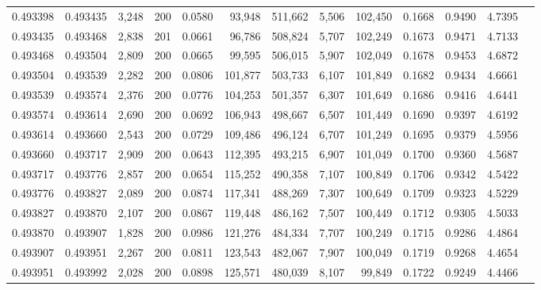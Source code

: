 \begin{tabular}{rrrrrrrrrrrrr}
0.493398 & 0.493435 & 3,248 & 200 &                                     0.0580 &  93,948 & 511,662 &   5,506 & 102,450 & 0.1668 & 0.9490 & 4.7395 \\
0.493435 & 0.493468 & 2,838 & 201 &                                     0.0661 &  96,786 & 508,824 &   5,707 & 102,249 & 0.1673 & 0.9471 & 4.7133 \\
0.493468 & 0.493504 & 2,809 & 200 &                                     0.0665 &  99,595 & 506,015 &   5,907 & 102,049 & 0.1678 & 0.9453 & 4.6872 \\
0.493504 & 0.493539 & 2,282 & 200 &                                     0.0806 & 101,877 & 503,733 &   6,107 & 101,849 & 0.1682 & 0.9434 & 4.6661 \\
0.493539 & 0.493574 & 2,376 & 200 &                                     0.0776 & 104,253 & 501,357 &   6,307 & 101,649 & 0.1686 & 0.9416 & 4.6441 \\
0.493574 & 0.493614 & 2,690 & 200 &                                     0.0692 & 106,943 & 498,667 &   6,507 & 101,449 & 0.1690 & 0.9397 & 4.6192 \\
0.493614 & 0.493660 & 2,543 & 200 &                                     0.0729 & 109,486 & 496,124 &   6,707 & 101,249 & 0.1695 & 0.9379 & 4.5956 \\
0.493660 & 0.493717 & 2,909 & 200 &                                     0.0643 & 112,395 & 493,215 &   6,907 & 101,049 & 0.1700 & 0.9360 & 4.5687 \\
0.493717 & 0.493776 & 2,857 & 200 &                                     0.0654 & 115,252 & 490,358 &   7,107 & 100,849 & 0.1706 & 0.9342 & 4.5422 \\
0.493776 & 0.493827 & 2,089 & 200 &                                     0.0874 & 117,341 & 488,269 &   7,307 & 100,649 & 0.1709 & 0.9323 & 4.5229 \\
0.493827 & 0.493870 & 2,107 & 200 &                                     0.0867 & 119,448 & 486,162 &   7,507 & 100,449 & 0.1712 & 0.9305 & 4.5033 \\
0.493870 & 0.493907 & 1,828 & 200 &                                     0.0986 & 121,276 & 484,334 &   7,707 & 100,249 & 0.1715 & 0.9286 & 4.4864 \\
0.493907 & 0.493951 & 2,267 & 200 &                                     0.0811 & 123,543 & 482,067 &   7,907 & 100,049 & 0.1719 & 0.9268 & 4.4654 \\
0.493951 & 0.493992 & 2,028 & 200 &                                     0.0898 & 125,571 & 480,039 &   8,107 &  99,849 & 0.1722 & 0.9249 & 4.4466 \\

\end{tabular}
